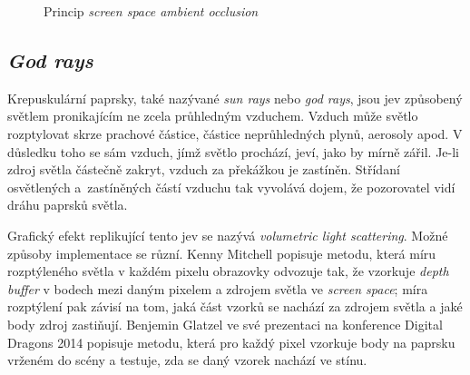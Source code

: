 \begin{figure}[H]
	\centering
	\caption{Princip \textit{screen space ambient occlusion}}
	\label{ssaoPrinciple}
\end{figure}\vspace{5mm}

\subsection{\textit{God rays}}
Krepuskulární paprsky, také nazývané \textit{sun rays} nebo \textit{god rays}, jsou jev způsobený světlem pronikajícím ne zcela průhledným vzduchem. Vzduch může světlo rozptylovat skrze prachové částice, částice neprůhledných plynů, aerosoly apod. V důsledku toho se sám vzduch, jímž světlo prochází, jeví, jako by mírně zářil. Je-li zdroj světla částečně zakryt, vzduch za překážkou je zastíněn. Střídaní osvětlených a~zastíněných částí vzduchu tak vyvolává dojem, že pozorovatel vidí dráhu paprsků světla.

Grafický efekt replikující tento jev se nazývá \textit{volumetric light scattering}. Možné způsoby implementace se různí. Kenny Mitchell \cite{2008Gg3} popisuje metodu, která míru rozptýleného světla v každém pixelu obrazovky odvozuje tak, že vzorkuje \textit{depth buffer} v bodech mezi daným pixelem a zdrojem světla ve \textit{screen space}; míra rozptýlení pak závisí na tom, jaká část vzorků se nachází za zdrojem světla a jaké body zdroj zastiňují. Benjemin Glatzel ve své prezentaci na konference Digital Dragons 2014 \cite{KAJXNthgvW2QWSpF} popisuje metodu, která pro každý pixel vzorkuje body na paprsku vrženém do scény a testuje, zda se daný vzorek nachází ve stínu.

